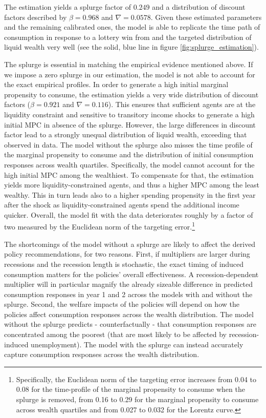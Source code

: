 \documentclass[\econtexRoot/HAFiscal]{subfiles}
\begin{document}
The estimation yields a splurge factor of $0.249$ and a distribution of discount factors described by $\beta = 0.968$ and $\nabla=0.0578$. Given these estimated parameters and the remaining calibrated ones, the model is able to replicate the time path of consumption in response to a lottery win from \citet{fagereng2021mpc} and the targeted distribution of liquid wealth very well (see the solid, blue line in figure \ref{fig:splurge_estimation}).

The splurge is essential in matching the empirical evidence mentioned above. If we impose a zero splurge in our estimation, the model is not able to account for the exact empirical profiles. In order to generate a high initial marginal propensity to consume, the estimation yields a very wide distribution of discount factors ($\beta = 0.921$ and $\nabla=0.116$). This ensures that sufficient agents are at the liquidity constraint and sensitive to transitory income shocks to generate a high initial MPC in absence of the splurge. However, the large differences in discount factor lead to a strongly unequal distribution of liquid wealth, exceeding that observed in data. The model without the splurge also misses the time profile of the marginal propensity to consume and the distribution of initial consumption responses across wealth quartiles. Specifically, the model cannot account for the high initial MPC among the wealthiest. To compensate for that, the estimation yields more liquidity-constrained agents, and thus a higher MPC among the least wealthy. This in turn leads also to a higher spending propensity in the first year after the shock as liquidity-constrained agents spend the additional income quicker. Overall, the model fit with the data deteriorates roughly by a factor of two measured by the Euclidean norm of the targeting error.\footnote{Specifically, the Euclidean norm of the targeting error increases from 0.04 to 0.08 for the time-profile of the marginal propensity to consume when the splurge is removed, from 0.16 to 0.29 for the marginal propensity to consume across wealth quartiles and from 0.027 to 0.032 for the Lorentz curve.}

The shortcomings of the model without a splurge are likely to affect the derived policy recommendations, for two reasons. 
First, if multipliers are larger during recessions and the recession length is stochastic, the exact timing of induced consumption matters for the policies' overall effectiveness. A recession-dependent multiplier will in particular magnify the already sizeable difference in predicted consumption responses in year 1 and 2 across the models with and without the splurge.
Second, the welfare impacts of the policies will depend on how the policies affect consumption responses across the wealth distribution. The model without the splurge predicts - counterfactually - that consumption responses are concentrated among the poorest (that are most likely to be affected by recession-induced unemployment). The model with the splurge can instead accurately capture consumption responses across the wealth distribution.
\end{document}
